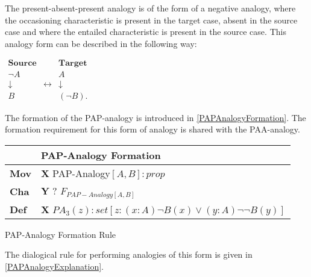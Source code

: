 				The present-absent-present analogy is of the form of a negative analogy, where the occasioning characteristic is present in  the target case, absent in the source case and where the entailed characteristic is present in the source case. This analogy form can be described in the following way:
                	\begin{table}[H]
                	\centering	
                	$
                    \begin{array}{ccc}
                    	\textbf{Source} &                 & \textbf{Target} \\
                    	\neg A          &  & A               \\
                    	\downarrow      & \leftrightarrow & \downarrow      \\
                    	B               &  & (\neg B).
                    \end{array}
                    $
               	 	\end{table}
               	 The formation of the PAP-analogy is introduced in \autoref{PAPAnalogyFormation}. The formation requirement for this form of analogy is shared with the PAA-analogy. 
               	 	
               		\begin{Scheme}[H]\footnotesize
               		\centering
               		\begin{tabular}{l l}
               			                   & \textbf{PAP-Analogy Formation} \\ \toprule
               			\textbf{Mov}      & \textbf{X} PAP-Analogy$[A,B] : prop$ \\ \midrule
               			\textbf{Cha} & \textbf{Y} ? $F_{PAP-Analogy[A,B]}$ \\ \midrule
               			\textbf{Def}   & \textbf{X} $PA_3(z) : set [z : (x : A) \neg B(x) \lor (y : A) \neg \neg B(y)]$ \\ \bottomrule
               		\end{tabular}
               		\caption{PAP-Analogy Formation Rule}
               		\label{PAPAnalogyFormation}
					\end{Scheme}               	 
               	 	               	 	
               	 \noindent The dialogical rule for performing analogies of this form is given in \autoref{PAPAnalogyExplanation}.
               	 
